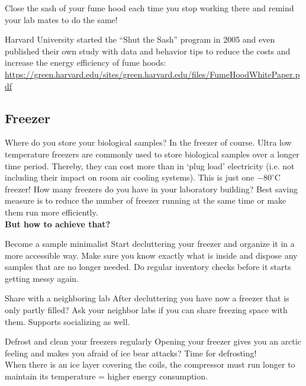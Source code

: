 \begin{suggest}{Close the sash of your fume hood each time you stop working there and remind your lab mates to do the same!}
\end{suggest}


Harvard University started the “Shut the Sash” program in 2005 and even published their own study with data and behavior tips to reduce the costs and increase the energy efficiency of fume hoods:   \\ \url{https://green.harvard.edu/sites/green.harvard.edu/files/FumeHoodWhitePaper.pdf} %

\subsection{Freezer}
Where do you store your biological samples? In the freezer of course. 
Ultra low temperature freezers are commonly used to store biological samples over a longer time period. Thereby, they can cost more than  in ‘plug load’ electricity (i.e. not including their impact on room air cooling systems). This is just one $-80^\circ \text{C}$ freezer!
How many freezers do you have in your laboratory building? 
Best saving measure is to reduce the number of freezer running at the same time or make them run more efficiently. \\

\textbf{But how to achieve that?  }

\begin{suggest}{Become a sample minimalist}
		Start decluttering your freezer and organize it in a more accessible way. Make sure you know exactly what is inside and dispose any samples that are no longer needed. Do regular inventory checks before it starts getting messy again. 
\end{suggest}

\begin{suggest}{Share with a neighboring lab}
	After decluttering you have now a freezer that is only partly filled? Ask your neighbor labs if you can share freezing space with them. Supports socializing as well.
\end{suggest}

\begin{suggest}{Defrost and clean your freezers regularly}
	Opening your freezer gives you an arctic feeling and makes you afraid of ice bear attacks? Time for defrosting!\\ 
	When there is an ice layer covering the coils, the compressor must run longer to maintain its temperature = higher energy consumption.
\end{suggest}

